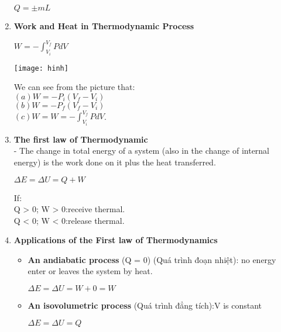 \documentclass[10pt]{article}
\begin{document}
\begin{enumerate}
\begin{mybox}
	\begin{center}
	$Q = \pm mL$
	\end{center}
	\end{mybox}
	\item \textbf{Work and Heat in Thermodynamic Process}
	\begin{mybox}
	\begin{center}
	$W = - \int_{V_i}^{V_f}PdV$
	\end{center}
	\end{mybox}
	\begin{center}
	\texttt{[image: hinh]}
	\end{center}
	We can see from the picture that:\\
	$(a) W= -P_i(V_f-V_i)$\\
	$(b) W= -P_f(V_f-V_i)$\\
	$(c) W= W = - \displaystyle \int_{V_i}^{V_f}PdV$.\\
	\item \textbf{The first law of Thermodynamic}\\
	- The change in total energy of a system (also in the change of internal energy) is the work done on it plus the heat transferred.
	\begin{mybox}
	\begin{center}
	$\Delta E = \Delta U = Q + W$
	\end{center}
	\end{mybox}
	If:\\
	Q > 0; W > 0:receive thermal.\\
	Q < 0; W < 0:release thermal.\\
	\item \textbf{Applications of the First law of Thermodynamics}\\
	\begin{itemize}
		\item \textbf{An andiabatic process} (Q = 0) (Quá trình đoạn nhiệt): no energy enter or leaves the system by heat.
		\begin{mybox}
		\begin{center}
		$\Delta E = \Delta U = W + 0 = W$
		\end{center}
		\end{mybox}
		\item \textbf{An isovolumetric process} (Quá trình đẳng tích):V is constant
		\begin{mybox}
		\begin{center}
		$\Delta E = \Delta U = Q$
		\end{center}

\end{mybox}
\end{itemize}
\end{enumerate}
\end{document}
